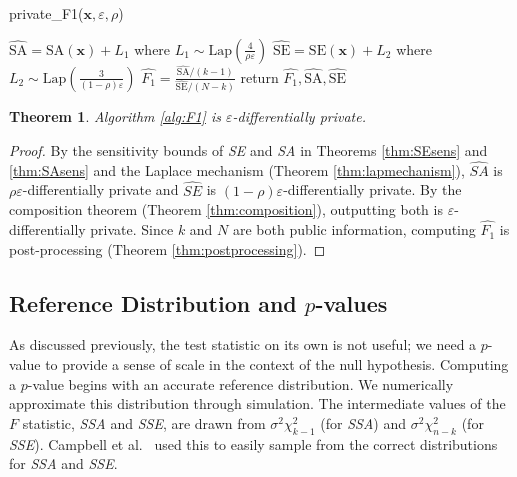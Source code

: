 \documentclass[USenglish,oneside]{article}
\newcounter{ab}
\newcounter{ar}
\newcounter{igh}
\newcounter{ms}
\newtheorem{theorem}{Theorem}
\newcommand{\dbsize}{\ensuremath{N}\xspace}
\newcommand{\eps}{\ensuremath{\varepsilon}\xspace}
\newcommand{\sse}{\textit{SSE}\xspace}
\newcommand{\ssa}{\textit{SSA}\xspace}
\newcommand{\se}{\textit{SE}\xspace}
\newcommand{\sa}{\textit{SA}\xspace}
\newcommand{\x}{\ensuremath{\mathbf{x}}\xspace}
\begin{document}
\begin{algorithm}
    \caption{private\_F1($\x,\eps, \rho$) \label{alg:F1}}
    \begin{algorithmic}
        \STATE $\widehat{\text{SA}} = \text{SA}(\x) + L_1$ where $L_1\sim\text{Lap}\left(\frac{4}{\rho\eps}\right)$ 
        \STATE $\widehat{\text{SE}} = \text{SE}(\x) + L_2$ where $L_2\sim\text{Lap}\left(\frac{3}{(1-\rho)\eps}\right)$
        \STATE  $\widehat{F_1} = \frac{\widehat{\text{SA}}/(k-1)}{\widehat{\text{SE}}/(N-k)}$
        \STATE return $\widehat{F_1}, \widehat{\text{SA}}, \widehat{\text{SE}}$
    \end{algorithmic}
\end{algorithm}

\begin{theorem} \label{thm:AlgPriv}
Algorithm \ref{alg:F1} is \eps-differentially private.
\end{theorem}
\begin{proof}
By the sensitivity bounds of \se and \sa in Theorems \ref{thm:SEsens} and \ref{thm:SAsens}  and the Laplace mechanism (Theorem \ref{thm:lapmechanism}), $\widehat{\sa}$ is $\rho\eps$-differentially private and $\widehat{\se}$ is $(1-\rho)\eps$-differentially private. By the composition theorem (Theorem \ref{thm:composition}), outputting both is \eps-differentially private. Since $k$ and \dbsize are both public information, computing $\widehat{F_1}$ is post-processing (Theorem \ref{thm:postprocessing}).
\end{proof}


\subsection{Reference Distribution and $p$-values}
\label{subsec:alg-method}

As discussed previously, the test statistic on its own is not useful; we need a $p$-value to provide a sense of scale in the context of the null hypothesis. Computing a $p$-value begins with an accurate reference distribution.  We numerically approximate this distribution through simulation.  The intermediate values of the $F$ statistic, \ssa and \sse, are drawn from  $\sigma^2\chi_{k-1}^2$ (for \ssa) and $\sigma^2\chi_{n-k}^2$ (for \sse).  Campbell et al.~\cite{campbell2018diffprivanova} used this to easily sample from the correct distributions for \ssa and \sse.
\end{document}
